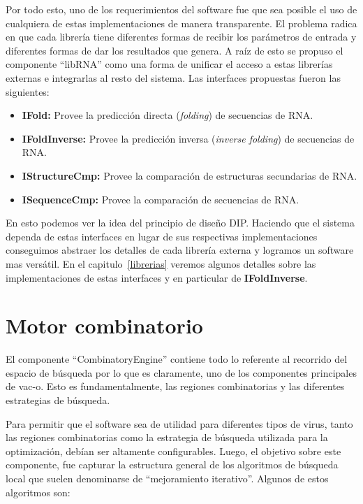 Por todo esto, uno de los requerimientos del software fue que sea posible el uso
de cualquiera de estas implementaciones de manera transparente. El problema
radica en que cada librer\'ia tiene diferentes formas de recibir los
par\'ametros de entrada y diferentes formas de dar los resultados que genera. A
ra\'iz de esto se propuso el componente ``libRNA'' como una forma de unificar el
acceso a estas librer\'ias externas e integrarlas al resto del sistema. Las
interfaces propuestas fueron las siguientes:

\begin{itemize}
 \item \textbf{IFold:} Provee la predicci\'on directa (\textit{folding})
de secuencias de \ac{RNA}.
 \item \textbf{IFoldInverse:} Provee la predicci\'on inversa (\textit{inverse
folding}) de secuencias de \ac{RNA}.
 \item \textbf{IStructureCmp:} Provee la comparaci\'on de estructuras
secundarias
de \ac{RNA}.
 \item \textbf{ISequenceCmp:} Provee la comparaci\'on de secuencias de
\ac{RNA}.
\end{itemize}

En esto podemos ver la idea del principio de dise\~no \ac{DIP}. Haciendo que el
sistema dependa de estas interfaces en lugar de sus respectivas
implementaciones conseguimos abstraer los detalles de cada librer\'ia externa y
logramos un software mas vers\'atil. En el capitulo~\ref{librerias} veremos
algunos detalles sobre las implementaciones de estas interfaces y en particular
de \textbf{IFoldInverse}.

\section{Motor combinatorio}
\label{diseno-motor}
El componente ``CombinatoryEngine'' contiene todo lo referente al recorrido del
espacio de b\'usqueda por lo que es claramente, uno de los componentes
principales de \ac{vac-o}. Esto es fundamentalmente, las regiones
combinatorias y las diferentes estrategias de b\'usqueda.

Para permitir que el software sea de utilidad para diferentes tipos de virus,
tanto las regiones combinatorias como la estrategia de b\'usqueda utilizada
para la optimizaci\'on, deb\'ian ser altamente configurables. Luego, el
objetivo sobre este componente, fue capturar la estructura general de los
algoritmos de b\'usqueda local que suelen denominarse de ``mejoramiento
iterativo''. Algunos de estos algoritmos son:

